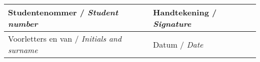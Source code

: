 \vfill

\noindent \begin{tabularx}{1.0\linewidth}{|L|L|}
    \hline
    \vspace{1cm} {Studentenommer / \textit{Student number}} & \vspace{1cm} {Handtekening / \textit{Signature}} \\
    \hline
    \vspace{1cm} {Voorletters en van / \textit{Initials and surname}} & \vspace{1cm} {Datum / \textit{Date}} \\
    \hline
\end{tabularx}

\vspace{15pt}


%
%
%
%
%

